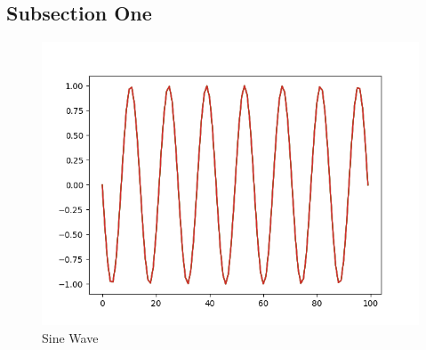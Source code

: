 \lipsum[1-2] %
\subsection{Subsection One}
\begin{figure}[h!]
    \centering
    \includegraphics[scale=0.4]{figures/sinewave.png}
    \caption{Sine Wave}
    \label{fig:sinwave}
\end{figure}
\lipsum[1] %
